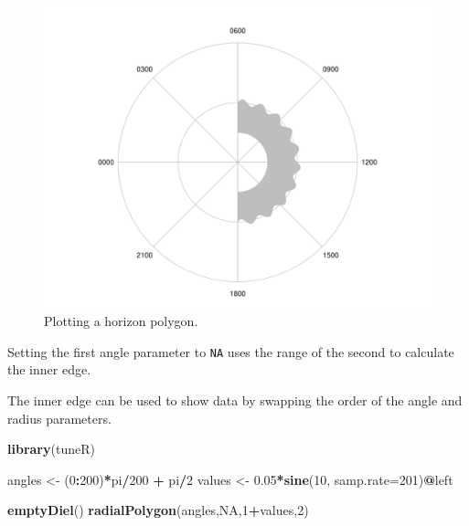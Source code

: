 \documentclass[
]{book}
\newenvironment{Shaded}{\begin{snugshade}}{\end{snugshade}}
\newcommand{\AttributeTok}[1]{\textcolor[rgb]{0.13,0.29,0.53}{#1}}
\newcommand{\ConstantTok}[1]{\textcolor[rgb]{0.56,0.35,0.01}{#1}}
\newcommand{\DecValTok}[1]{\textcolor[rgb]{0.00,0.00,0.81}{#1}}
\newcommand{\FloatTok}[1]{\textcolor[rgb]{0.00,0.00,0.81}{#1}}
\newcommand{\FunctionTok}[1]{\textcolor[rgb]{0.13,0.29,0.53}{\textbf{#1}}}
\newcommand{\NormalTok}[1]{#1}
\newcommand{\OtherTok}[1]{\textcolor[rgb]{0.56,0.35,0.01}{#1}}
\newcommand{\SpecialCharTok}[1]{\textcolor[rgb]{0.81,0.36,0.00}{\textbf{#1}}}
\begin{document}
\begin{figure}

{\centering \includegraphics[width=0.9\linewidth]{_main_files/figure-latex/radialPolygon-horizon-1} 

}

\caption{Plotting a horizon polygon.}\label{fig:radialPolygon-horizon}
\end{figure}

Setting the first angle parameter to \texttt{NA} uses the range of the second to calculate the inner edge.

The inner edge can be used to show data by swapping the order of the angle and radius parameters.

\begin{Shaded}
\begin{Highlighting}[]
\FunctionTok{library}\NormalTok{(tuneR)}

\NormalTok{angles }\OtherTok{\textless{}{-}}\NormalTok{ (}\DecValTok{0}\SpecialCharTok{:}\DecValTok{200}\NormalTok{)}\SpecialCharTok{*}\NormalTok{pi}\SpecialCharTok{/}\DecValTok{200} \SpecialCharTok{+}\NormalTok{ pi}\SpecialCharTok{/}\DecValTok{2}
\NormalTok{values }\OtherTok{\textless{}{-}} \FloatTok{0.05}\SpecialCharTok{*}\FunctionTok{sine}\NormalTok{(}\DecValTok{10}\NormalTok{, }\AttributeTok{samp.rate=}\DecValTok{201}\NormalTok{)}\SpecialCharTok{@}\NormalTok{left}

\FunctionTok{emptyDiel}\NormalTok{()}
\FunctionTok{radialPolygon}\NormalTok{(angles,}\ConstantTok{NA}\NormalTok{,}\DecValTok{1}\SpecialCharTok{+}\NormalTok{values,}\DecValTok{2}\NormalTok{)}
\end{Highlighting}
\end{Shaded}
\end{document}
